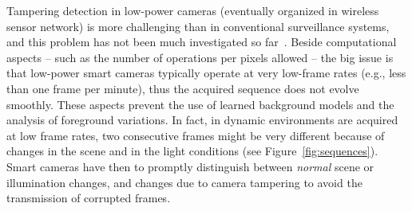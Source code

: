 \documentclass{llncs}
\begin{document}
Tampering detection in low-power cameras (eventually organized in wireless sensor network) is more challenging than in conventional surveillance systems, and this problem has not been much investigated so far~\cite{perrig2004security,alippi2010detecting}. Beside computational aspects -- such as the number of operations per pixels allowed -- the big issue is that low-power smart cameras typically operate at very low-frame rates (e.g., less than one frame per minute), thus the acquired sequence does not evolve smoothly. These aspects prevent the use of learned background models and the analysis of foreground variations. In fact, in dynamic environments are acquired at low frame rates, two consecutive frames might be very different because of changes in the scene and in the light conditions (see Figure~\ref{fig:sequences}). Smart cameras have then to promptly distinguish between \emph{normal} scene or illumination changes, and changes due to camera tampering to avoid the transmission of corrupted frames. %
\end{document}
